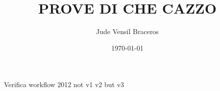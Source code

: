 \documentclass{article}
\title{PROVE DI CHE CAZZO}
\author{Jude Vensil Braceros}
\date{\today}
\begin{document}
\maketitle

Verifica workflow 2012 not v1 v2 but v3
\end{document}
